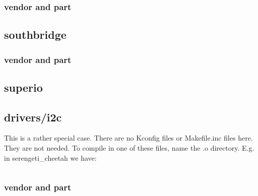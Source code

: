 \documentclass[10pt,letterpaper]{article}
\begin{document}
\subsubsection{vendor and part}
\subsection{southbridge}
\subsubsection{vendor and part}
\subsection{superio}
\subsection{drivers/i2c}
This is a rather special case. There are no Kconfig files or Makefile.inc files here. They are not needed.
To compile in one of these files, name the .o directory. E.g. in serengeti\_cheetah we have:
\begin{verbatim}
\end{verbatim}

\subsubsection{vendor and part}
\end{document}
